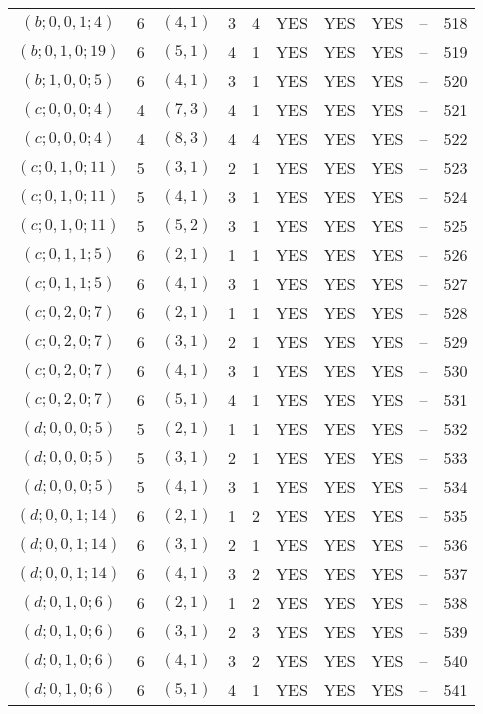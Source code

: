\begin{longtable}{|c|c|c|c|c|c|c|c|c|c|}
$(b; 0, 0, 1; 4)$ & 6 & $(4, 1)$ & 3 & 4 & YES & YES & YES & -- & 518\\
$(b; 0, 1, 0; 19)$ & 6 & $(5, 1)$ & 4 & 1 & YES & YES & YES & -- & 519\\
$(b; 1, 0, 0; 5)$ & 6 & $(4, 1)$ & 3 & 1 & YES & YES & YES & -- & 520\\
$(c; 0, 0, 0; 4)$ & 4 & $(7, 3)$ & 4 & 1 & YES & YES & YES & -- & 521\\
$(c; 0, 0, 0; 4)$ & 4 & $(8, 3)$ & 4 & 4 & YES & YES & YES & -- & 522\\
$(c; 0, 1, 0; 11)$ & 5 & $(3, 1)$ & 2 & 1 & YES & YES & YES & -- & 523\\
$(c; 0, 1, 0; 11)$ & 5 & $(4, 1)$ & 3 & 1 & YES & YES & YES & -- & 524\\
$(c; 0, 1, 0; 11)$ & 5 & $(5, 2)$ & 3 & 1 & YES & YES & YES & -- & 525\\
$(c; 0, 1, 1; 5)$ & 6 & $(2, 1)$ & 1 & 1 & YES & YES & YES & -- & 526\\
$(c; 0, 1, 1; 5)$ & 6 & $(4, 1)$ & 3 & 1 & YES & YES & YES & -- & 527\\
$(c; 0, 2, 0; 7)$ & 6 & $(2, 1)$ & 1 & 1 & YES & YES & YES & -- & 528\\
$(c; 0, 2, 0; 7)$ & 6 & $(3, 1)$ & 2 & 1 & YES & YES & YES & -- & 529\\
$(c; 0, 2, 0; 7)$ & 6 & $(4, 1)$ & 3 & 1 & YES & YES & YES & -- & 530\\
$(c; 0, 2, 0; 7)$ & 6 & $(5, 1)$ & 4 & 1 & YES & YES & YES & -- & 531\\
$(d; 0, 0, 0; 5)$ & 5 & $(2, 1)$ & 1 & 1 & YES & YES & YES & -- & 532\\
$(d; 0, 0, 0; 5)$ & 5 & $(3, 1)$ & 2 & 1 & YES & YES & YES & -- & 533\\
$(d; 0, 0, 0; 5)$ & 5 & $(4, 1)$ & 3 & 1 & YES & YES & YES & -- & 534\\
$(d; 0, 0, 1; 14)$ & 6 & $(2, 1)$ & 1 & 2 & YES & YES & YES & -- & 535\\
$(d; 0, 0, 1; 14)$ & 6 & $(3, 1)$ & 2 & 1 & YES & YES & YES & -- & 536\\
$(d; 0, 0, 1; 14)$ & 6 & $(4, 1)$ & 3 & 2 & YES & YES & YES & -- & 537\\
$(d; 0, 1, 0; 6)$ & 6 & $(2, 1)$ & 1 & 2 & YES & YES & YES & -- & 538\\
$(d; 0, 1, 0; 6)$ & 6 & $(3, 1)$ & 2 & 3 & YES & YES & YES & -- & 539\\
$(d; 0, 1, 0; 6)$ & 6 & $(4, 1)$ & 3 & 2 & YES & YES & YES & -- & 540\\
$(d; 0, 1, 0; 6)$ & 6 & $(5, 1)$ & 4 & 1 & YES & YES & YES & -- & 541\\

\end{longtable}
